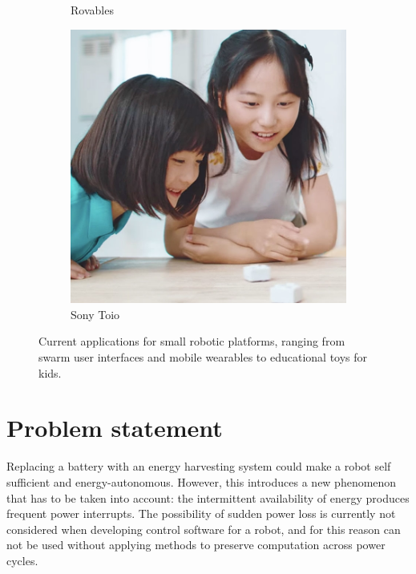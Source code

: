 \begin{figure}
\begin{subfigure}[b]{0.324\textwidth}
		\caption{Rovables~\cite{dementyev_uist_2016}}
		\label{fig:int_roverables}
	\end{subfigure}
	\begin{subfigure}[b]{0.323\textwidth}
		\includegraphics[width=\textwidth]{pics/toio.jpg}
		\caption{Sony Toio~\cite{sony_toio_2017}}
		\label{fig:int_toio}
	\end{subfigure}
	\caption{Current applications for small robotic platforms, ranging from swarm user interfaces and mobile wearables to educational toys for kids.}
	\label{fig:int_example_sui}
\end{figure}

\section{Problem statement}




Replacing a battery with an energy harvesting system could make a robot self sufficient and energy-autonomous. 
However, this introduces a new phenomenon that has to be taken into account: the intermittent availability of energy produces frequent power interrupts.
The possibility of sudden power loss is currently not considered when developing control software for a robot, and for this reason can not be used without applying methods to preserve computation across power cycles.%

